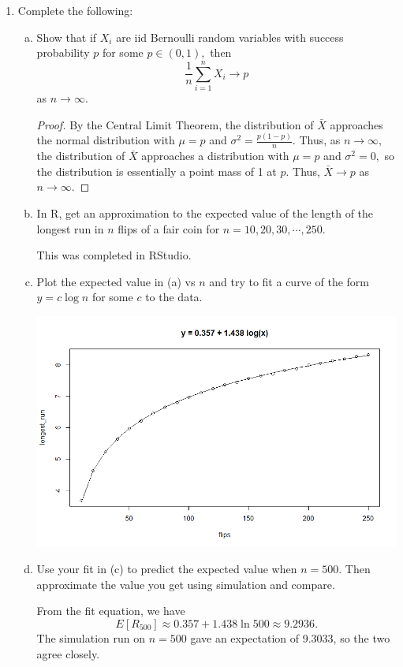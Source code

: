\documentclass{article}
\begin{document}
\begin{enumerate}
	\item Complete the following:
		\begin{enumerate}[(a)]
			\item Show that if $X_i$ are iid Bernoulli random variables with success probability $p$ for some $p\in(0, 1),$ then \[\frac{1}{n}\sum_{i=1}^n X_i\to p\] as $n\to\infty.$
				\begin{proof}
					By the Central Limit Theorem, the distribution of $\bar{X}$ approaches the normal distribution with $\mu=p$ and $\sigma^2=\frac{p(1-p)}{n}.$ Thus, as $n\to\infty,$ the distribution of $\bar{X}$ approaches a distribution with $\mu=p$ and $\sigma^2=0,$ so the distribution is essentially a point mass of 1 at $p.$ Thus, $\bar{X}\to p$ as $n\to\infty.$
					
				\end{proof}

			\item In R, get an approximation to the expected value of the length of the longest run in $n$ flips of a fair coin for $n=10, 20, 30, \cdots, 250.$
				\begin{answer*}
					This was completed in RStudio. 
				\end{answer*}

			\item Plot the expected value in (a) vs $n$ and try to fit a curve of the form $y=c\log n$ for some $c$ to the data.
					\begin{center}
						\includegraphics[width=14cm]{longest_run.png}
					\end{center}					

			\item Use your fit in (c) to predict the expected value when $n=500.$ Then approximate the value you get using simulation and compare.
				\begin{soln}
					From the fit equation, we have \[E[R_{500}]\approx 0.357+1.438\ln500 \approx 9.2936. \] The simulation run on $n=500$ gave an expectation of 9.3033, so the two agree closely.
					

\end{soln}
\end{enumerate}
\end{enumerate}
\end{document}
